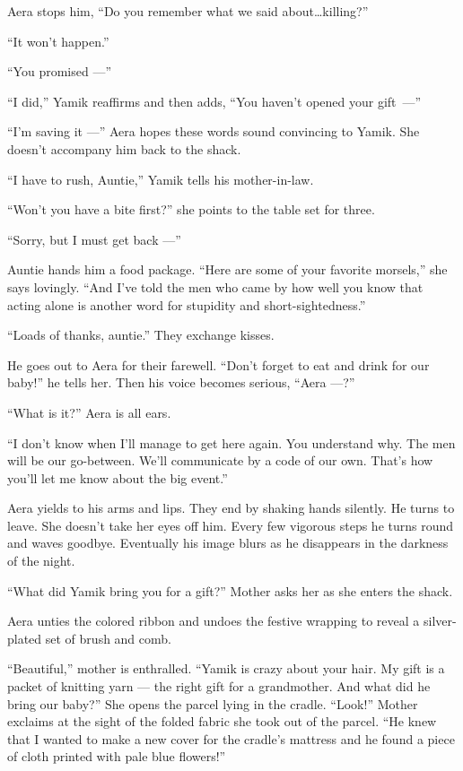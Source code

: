 \documentclass[twoside,11pt,openany]{book}
\begin{document}
Aera stops him, ``Do you remember what we said about{\ldots}killing?''

``It won't happen.''

``You promised ---''

``I did,'' Yamik reaffirms and then adds, ``You haven't opened your gift~---''

``I'm saving it ---'' Aera hopes these words sound convincing to Yamik. She doesn't accompany
him back to the shack.

``I have to rush, Auntie,'' Yamik tells his mother-in-law.

``Won't you have a bite first?'' she points to the table set for three.

``Sorry, but I must get back ---''

Auntie hands him a food package. ``Here are some of your favorite morsels,'' she says
lovingly. ``And I've told the men who came by how well you know that acting alone is another word for
stupidity and short-sightedness.''

``Loads of thanks, auntie.'' They exchange kisses.

He goes out{ }to Aera for their farewell. ``Don't forget to eat and drink for our
baby!'' he tells her. Then his voice becomes serious, ``Aera ---?''

``What is it?'' Aera is all ears.

``I don't know when I'll manage to get here again. You understand why. The men will be our go-between.
We'll communicate by a code of our own. That's how you'll let me know about the big event.''

Aera yields to his arms and lips. They end by shaking hands silently.  He turns to leave. She doesn't take her eyes off
him. Every few vigorous steps he turns round and waves goodbye. Eventually his image blurs as he disappears in the
darkness of the night.

``What did Yamik bring you for a gift?'' Mother asks her as she enters the shack.

Aera unties the colored ribbon and undoes the festive wrapping to reveal a silver-plated set of brush and comb.

``Beautiful,'' mother is enthralled. ``Yamik is crazy about your hair. My gift is
a packet of knitting yarn --- the right gift for a grandmother. And what did he bring our baby?'' She opens
the parcel lying in the cradle. ``Look!'' Mother exclaims at the sight of the folded fabric
she took out of the parcel. ``He knew that I wanted to make a new cover for the cradle's mattress and he
found a piece of cloth printed with pale blue flowers!''
\end{document}
